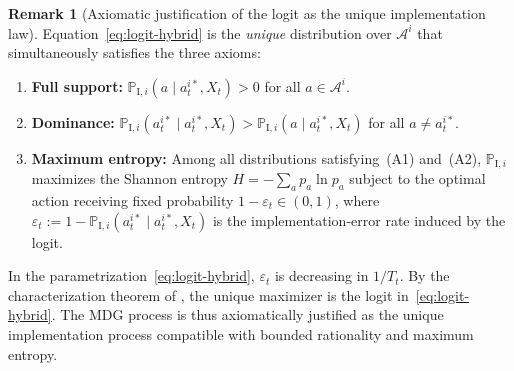 \documentclass[ecta,nameyear,final,supplement]{econsocart}
\numberwithin{equation}{section}
\numberwithin{table}{section}
\theoremstyle{definition}
\newtheorem{remark}[theorem]{Remark}
\newcommand{\ProbI}[1]{\mathbb{P}_{\mathrm{I},#1}}
\begin{document}
\begin{remark}[Axiomatic justification of the logit as the unique implementation law]
\label{rem:axiomas-logit}
Equation~\eqref{eq:logit-hybrid} is the \emph{unique} distribution over
$\mathcal{A}^i$ that simultaneously satisfies the three axioms:
\begin{enumerate}
  \item[\textup{(A1)}] \textbf{Full support:}
  $\ProbI{i}(a\mid a_t^{i\ast},X_t)>0$ for all $a\in\mathcal{A}^i$.
  \item[\textup{(A2)}] \textbf{Dominance:}
  $\ProbI{i}(a_t^{i\ast}\mid a_t^{i\ast},X_t)>\ProbI{i}(a\mid a_t^{i\ast},X_t)$
  for all $a\neq a_t^{i\ast}$.
  \item[\textup{(A3)}] \textbf{Maximum entropy:}
  Among all distributions satisfying~(A1) and~(A2),
  $\ProbI{i}$ maximizes the Shannon entropy
  $H=-\sum_a p_a\ln p_a$ subject to the optimal action receiving fixed
  probability $1-\varepsilon_t\in(0,1)$, where
  $\varepsilon_t:=1-\ProbI{i}(a_t^{i\ast}\mid a_t^{i\ast},X_t)$ is the
  implementation-error rate induced by the logit.
\end{enumerate}
In the parametrization~\eqref{eq:logit-hybrid}, $\varepsilon_t$ is decreasing
in $1/T_t$. By the characterization theorem of \citet{Jaynes1957Information}, the unique
maximizer is the logit in~\eqref{eq:logit-hybrid}. The MDG process is thus
axiomatically justified as the unique implementation process compatible with
bounded rationality and maximum entropy.
\end{remark}

\bigskip
\end{document}
